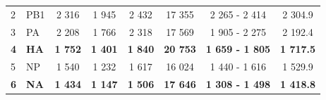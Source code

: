 \begin{table}[ht!]
\begin{tabular}{@{}llcccccc@{}}
	2                & PB1               & \multicolumn{1}{c|}{2 316}                                                      & 1 945                                                                          & \multicolumn{1}{c|}{2 432}                                                      & 17 355                                                                        & 2 265 - 2 414                      & 2 304.9                                                                     \\
	3                & PA                & \multicolumn{1}{c|}{2 208}                                                      & 1 766                                                                          & \multicolumn{1}{c|}{2 318}                                                      & 17 569                                                                        & 1 905 - 2 275                      & 2 192.4                                                                     \\
	\textbf{4}       & \textbf{HA}       & \multicolumn{1}{c|}{\textbf{1 752}}                                             & \textbf{1 401}                                                                 & \multicolumn{1}{c|}{\textbf{1 840}}                                             & \textbf{20 753}                                                               & \textbf{1 659 - 1 805}             & \textbf{1 717.5}                                                            \\
	5                & NP                & \multicolumn{1}{c|}{1 540}                                                      & 1 232                                                                          & \multicolumn{1}{c|}{1 617}                                                      & 16 024                                                                        & 1 440 - 1 616                      & 1 529.9                                                                     \\
	\textbf{6}       & \textbf{NA}       & \multicolumn{1}{c|}{\textbf{1 434}}                                             & \textbf{1 147}                                                                 & \multicolumn{1}{c|}{\textbf{1 506}}                                             & \textbf{17 646}                                                               & \textbf{1 308 - 1 498}             & \textbf{1 418.8}                                                            \\

\end{tabular}
\end{table}
